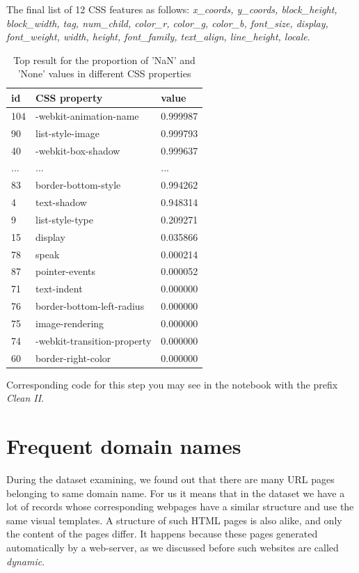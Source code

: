 The final list of 12 CSS features as follows: \textit{x\_coords, y\_coords, block\_height, block\_width, tag, num\_child, color\_r, color\_g, color\_b, font\_size, display, font\_weight, width, height, font\_family, text\_align, line\_height, locale}.\\

\begin{table}[h]
\begin{center}
{\renewcommand{\arraystretch}{1.5}
\begin{tabular}{| p{2cm} | p{5cm}| p{3cm} |}
\hline
\textbf{id}	&	\textbf{CSS property}	&	\textbf{value} \\
\hline
104	&	-webkit-animation-name	&	0.999987 \\
\hline
90	&	list-style-image	&	0.999793 \\
\hline
40	&	-webkit-box-shadow	&	0.999637 \\
\hline
...	&	...	&	... \\
\hline
83	&	border-bottom-style	&	0.994262 \\
\hline
4	&	text-shadow	&	0.948314 \\
\hline
9	&	list-style-type	&	0.209271 \\
\hline
15	&	display	&	0.035866 \\
\hline
78	&	speak	&	0.000214 \\
\hline
87	&	pointer-events	&	0.000052 \\
\hline
71	&	text-indent	&	0.000000 \\
\hline
76	&	border-bottom-left-radius	&	0.000000 \\
\hline
75	&	image-rendering	&	0.000000 \\
\hline
74	&	-webkit-transition-property	&	0.000000 \\
\hline
60	&	border-right-color	&	0.000000 \\
\hline
\end{tabular}}
\caption{Top result for the proportion of 'NaN' and 'None' values in different CSS properties }
\label{table:cssnan}
\end{center}
\end{table}


Corresponding code for this step you may see in the notebook with the prefix \textit{Clean II}.

\section{Frequent domain names}
During the dataset examining, we found out that there are many URL pages belonging to same domain name. For us it means that in the dataset we have a lot of records whose corresponding webpages have a similar structure and use the same visual templates. A structure of such HTML pages is also alike, and only the content of the pages differ. It happens because these pages generated automatically by a web-server, as we discussed before such websites are called \textit{dynamic}.\\ 

